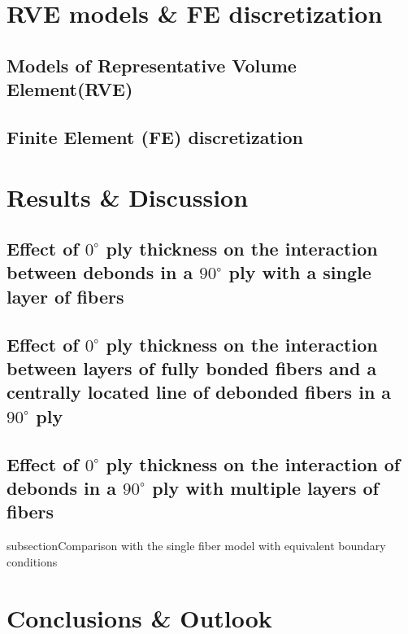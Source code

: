 \documentclass[review]{elsarticle}
\begin{document}
\section{RVE models \& FE discretization}

\subsection{Models of Representative Volume Element(RVE)}

\subsection{Finite Element (FE) discretization}

\section{Results \& Discussion}

\subsection{Effect of $0^{\circ}$ ply thickness on the interaction between debonds in a $90^{\circ}$ ply with a single layer of fibers}

\subsection{Effect of $0^{\circ}$ ply thickness on the interaction between layers of fully bonded fibers and a centrally located line of debonded fibers in a $90^{\circ}$ ply}

\subsection{Effect of $0^{\circ}$ ply thickness on the interaction of debonds in a $90^{\circ}$ ply with multiple layers of fibers}

subsection{Comparison with the single fiber model with equivalent boundary conditions}

\section{Conclusions \& Outlook}
\end{document}
